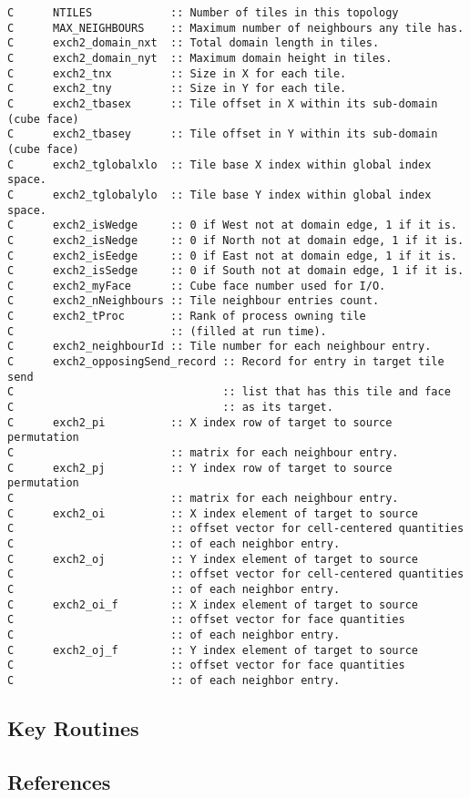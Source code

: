 \begin{verbatim}
C      NTILES            :: Number of tiles in this topology 
C      MAX_NEIGHBOURS    :: Maximum number of neighbours any tile has.
C      exch2_domain_nxt  :: Total domain length in tiles. 
C      exch2_domain_nyt  :: Maximum domain height in tiles. 
C      exch2_tnx         :: Size in X for each tile.                  
C      exch2_tny         :: Size in Y for each tile.                  
C      exch2_tbasex      :: Tile offset in X within its sub-domain (cube face)
C      exch2_tbasey      :: Tile offset in Y within its sub-domain (cube face)
C      exch2_tglobalxlo  :: Tile base X index within global index space.
C      exch2_tglobalylo  :: Tile base Y index within global index space.
C      exch2_isWedge     :: 0 if West not at domain edge, 1 if it is.   
C      exch2_isNedge     :: 0 if North not at domain edge, 1 if it is.   
C      exch2_isEedge     :: 0 if East not at domain edge, 1 if it is.   
C      exch2_isSedge     :: 0 if South not at domain edge, 1 if it is.   
C      exch2_myFace      :: Cube face number used for I/O.               
C      exch2_nNeighbours :: Tile neighbour entries count.               
C      exch2_tProc       :: Rank of process owning tile                 
C                        :: (filled at run time).                       
C      exch2_neighbourId :: Tile number for each neighbour entry.        
C      exch2_opposingSend_record :: Record for entry in target tile send 
C                                :: list that has this tile and face     
C                                :: as its target.                       
C      exch2_pi          :: X index row of target to source permutation 
C                        :: matrix for each neighbour entry.            
C      exch2_pj          :: Y index row of target to source permutation 
C                        :: matrix for each neighbour entry.            
C      exch2_oi          :: X index element of target to source 
C                        :: offset vector for cell-centered quantities  
C                        :: of each neighbor entry.                     
C      exch2_oj          :: Y index element of target to source 
C                        :: offset vector for cell-centered quantities  
C                        :: of each neighbor entry.                     
C      exch2_oi_f        :: X index element of target to source 
C                        :: offset vector for face quantities           
C                        :: of each neighbor entry.                     
C      exch2_oj_f        :: Y index element of target to source 
C                        :: offset vector for face quantities           
C                        :: of each neighbor entry.                     
\end{verbatim}




\subsection{Key Routines}



\subsection{References}
